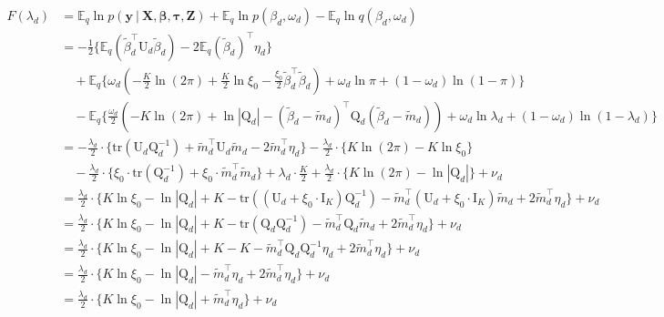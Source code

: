 \documentclass[twoside,11pt]{article}
\newcommand\given[1][]{\:#1\vert\:}
\newcommand{\transpose}[1]{#1^{\intercal}}
\newcommand{\boldbeta}{\boldsymbol\beta}
\newcommand{\boldtau}{\boldsymbol\tau}
\newcommand{\E}{\mathbb{E}}
\newcommand{\betad}{\tilde{\beta}_d}
\newcommand{\umat}{\mathrm{U}}
\newcommand{\qmat}{\mathrm{Q}}
\newcommand{\pr}[1]{p \left( #1 \right)}
\newcommand{\trace}[1]{\mathrm{tr} \left( #1 \right)}
\begin{document}
\begin{align*}
	F(\lambda_d) &= \E_q \ln \pr{\mathbf{y} \given \mathbf{X}, \boldbeta, \boldtau, \mathbf{Z}} + \E_q \ln \pr{\beta_d, \omega_d} - \E_q \ln q \left( \beta_d, \omega_d \right) \\
	&= - \frac{1}{2}\Big\{ \E_q \left( \transpose{\betad} \umat_d \betad\right) - 2 \transpose{\E_q \left( \betad \right)} \eta_d \Big\} \\
	& \quad + \E_q \Big\{ \omega_d \left( -\frac{K}{2} \ln (2\pi) + \frac{K}{2} \ln \xi_0 - \frac{\xi_0}{2} \transpose{\betad} \betad  \right) + \omega_d \ln \pi + (1 - \omega_d) \ln (1 - \pi) \Big\} \\
	& \quad - \E_q \Big\{ \frac{\omega_d}{2} \left( -K \ln (2 \pi) + \ln |\qmat_d | - \transpose{\left( \betad - \tilde{m}_d \right)} \qmat_d \left( \betad - \tilde{m}_d \right)\right) + \omega_d \ln \lambda_d + (1-\omega_d) \ln (1 - \lambda_d) \Big\} \\
	&= -\frac{\lambda_d }{2}  \cdot \Big\{ \trace{\umat_d \qmat_d^{-1}} + \transpose{\tilde{m}_d} \umat_d \tilde{m}_d - 2 \transpose{\tilde{m}_d} \eta_d \Big\}-\frac{\lambda_d }{2}  \cdot \Big\{ K \ln(2\pi) - K \ln \xi_0 \Big\} \\
	& \quad -\frac{\lambda_d }{2}  \cdot \Big\{ \xi_0 \cdot \trace{\qmat_d^{-1}} + \xi_0 \cdot \transpose{\tilde{m}_d} \tilde{m}_d \Big\} + \lambda_d \cdot \frac{K}{2} + \frac{\lambda_d}{2}  \cdot \Big\{ K \ln (2\pi) - \ln |\qmat_d | \Big\} + \nu_d \\
	&= \frac{\lambda_d}{2} \cdot \Bigg\{ K \ln \xi_0 - \ln |\qmat_d | + K -  \trace{\left(\umat_d + \xi_0 \cdot \mathrm{I}_K \right) \qmat_d^{-1}} - \transpose{\tilde{m}_d} \left( \umat_d + \xi_0 \cdot \mathrm{I}_K \right) \tilde{m}_d + 2\transpose{\tilde{m}_d}\eta_d \Bigg\} + \nu_d\\
	&= \frac{\lambda_d}{2} \cdot \Bigg\{ K \ln \xi_0 - \ln |\qmat_d | + K -  \trace{\qmat_d \qmat_d^{-1}} - \transpose{\tilde{m}_d} \qmat_d \tilde{m}_d + 2\transpose{\tilde{m}_d}\eta_d \Bigg\} + \nu_d\\ 
	&= \frac{\lambda_d}{2} \cdot \Bigg\{ K \ln \xi_0 - \ln |\qmat_d | + K - K - \transpose{\tilde{m}_d} \qmat_d \qmat_d^{-1} \eta_d + 2\transpose{\tilde{m}_d}\eta_d \Bigg\} + \nu_d\\ 
	&= \frac{\lambda_d}{2} \cdot \Bigg\{ K \ln \xi_0 - \ln |\qmat_d | - \transpose{\tilde{m}_d} \eta_d + 2\transpose{\tilde{m}_d}\eta_d \Bigg\} + \nu_d\\ 
	&= \frac{\lambda_d}{2} \cdot \Bigg\{ K \ln \xi_0 - \ln |\qmat_d | + \transpose{\tilde{m}_d} \eta_d \Bigg\} + \nu_d
\end{align*}
\end{document}
